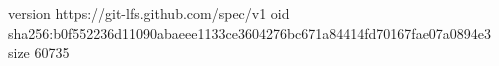 version https://git-lfs.github.com/spec/v1
oid sha256:b0f552236d11090abaeee1133ce3604276bc671a84414fd70167fae07a0894e3
size 60735
